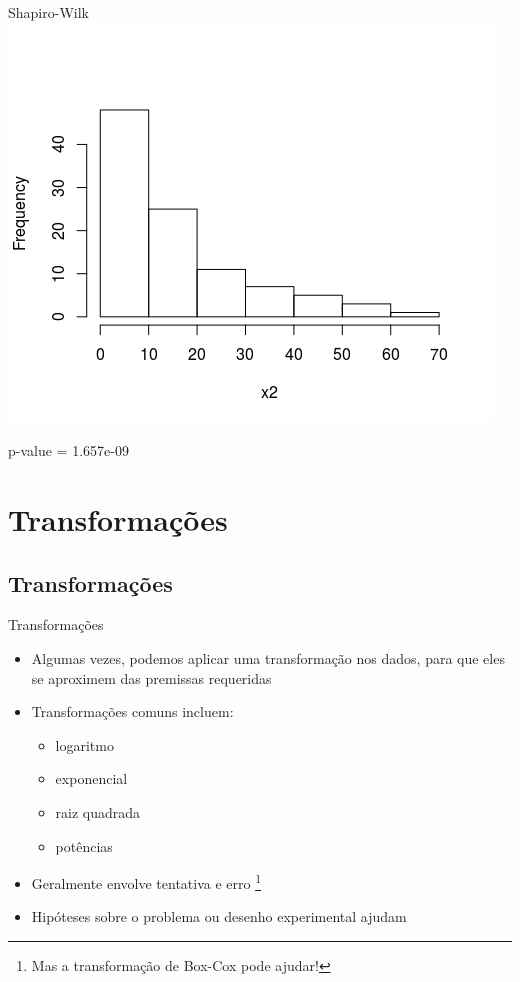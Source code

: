 \documentclass{beamer}
\begin{document}
\begin{frame}{Shapiro-Wilk}
  \centering
  \includegraphics[width=.8\textwidth]{Cap37-38/lognormal1-h}

  p-value = 1.657e-09
\end{frame}

\section{Transformações}

\subsection{Transformações}

\begin{frame}{Transformações}
  \begin{itemize}
  \item Algumas vezes, podemos aplicar uma transformação nos dados, para que eles se aproximem das premissas requeridas
  \item Transformações comuns incluem:
    \begin{itemize}
    \item logaritmo
    \item exponencial
    \item raiz quadrada
    \item potências
    \end{itemize}
  \item Geralmente envolve tentativa e erro \footnote{Mas a transformação de Box-Cox pode ajudar!}
  \item Hipóteses sobre o problema ou desenho experimental ajudam
  \end{itemize}
\end{frame}
\end{document}
